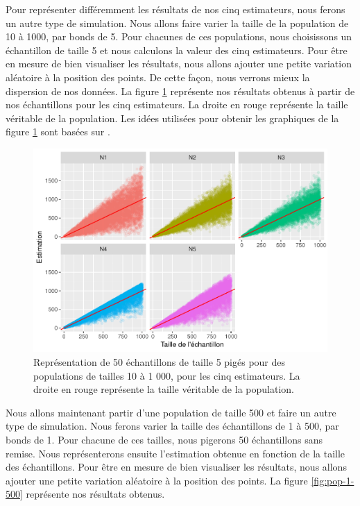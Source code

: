\documentclass[10pt]{article}
\begin{document}
Pour représenter différemment les résultats de nos cinq estimateurs,
nous ferons un autre type de simulation. Nous allons faire varier la
taille de la population de 10 à 1000, par bonds de 5. Pour chacunes de
ces populations, nous choisissons un échantillon de taille 5 et nous
calculons la valeur des cinq estimateurs. Pour être en mesure de bien
visualiser les résultats, nous allons ajouter une petite variation
aléatoire à la position des points. De cette façon, nous verrons mieux
la dispersion de nos données. La figure \ref{fig:ech-10-1000} représente
nos résultats obtenus à partir de nos échantillons pour les cinq
estimateurs. La droite en rouge représente la taille véritable de la
population. Les idées utilisées pour obtenir les graphiques de la figure
\ref{fig:ech-10-1000} sont basées sur \cite{Hinno}.

\begin{figure}[!htb]

{\centering \includegraphics[width=0.9\linewidth]{serial_number_amq_files/figure-latex/ech-10-1000-1} 

}

\caption{Représentation de 50 échantillons de taille 5 pigés pour des populations de tailles 10 à 1 000, pour les cinq estimateurs. La droite en rouge représente la taille véritable de la population.}\label{fig:ech-10-1000}
\end{figure}

Nous allons maintenant partir d'une population de taille 500 et faire un
autre type de simulation. Nous ferons varier la taille des échantillons
de 1 à 500, par bonds de 1. Pour chacune de ces tailles, nous pigerons
50 échantillons sans remise. Nous représenterons ensuite l'estimation
obtenue en fonction de la taille des échantillons. Pour être en mesure
de bien visualiser les résultats, nous allons ajouter une petite
variation aléatoire à la position des points. La figure
\ref{fig:pop-1-500} représente nos résultats obtenus.
\end{document}
